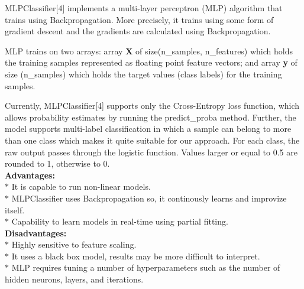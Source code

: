 \documentclass[a4paper, 10pt, conference]{IEEEtran}
\begin{document}
MLPClassifier[4] implements a multi-layer perceptron (MLP) algorithm that trains using Backpropagation. More precisely, it trains using some form of gradient descent and the gradients are calculated using Backpropagation.

MLP trains on two arrays: array \textbf{X} of size(n\_samples, n\_features) which holds the training samples represented as floating point feature vectors; and array \textbf{y} of size (n\_samples) which holds the target values (class labels) for the training samples. 

Currently, MLPClassifier[4] supports only the Cross-Entropy loss function, which allows probability estimates by running the predict\_proba method. 
Further, the model supports multi-label classification in which a sample can belong to more than one class which makes it quite suitable for our approach. For each class, the raw output passes through the logistic function. Values larger or equal to 0.5 are rounded to 1, otherwise to 0.\\

\textbf{Advantages:}\\
\indent $\ast$ It is capable to run non-linear models.\\
\indent $\ast$ MLPClassifier uses Backpropagation so, it continously learns and improvize itself.\\
\indent $\ast$ Capability to learn models in real-time using partial fitting.\\

\textbf{Disadvantages:}\\
\indent $\ast$ Highly sensitive to feature scaling.\\
\indent $\ast$ It uses a black box model, results may be more difficult to interpret.\\
\indent $\ast$ MLP requires tuning a number of hyperparameters such as the number of hidden neurons, layers, and iterations.
\end{document}
